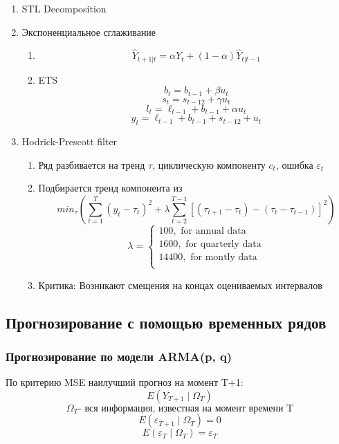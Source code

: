 \documentclass[a4paper, 12pt]{article}
\begin{document}
\begin{enumerate}
    \item STL Decomposition
    \item Экспоненциальное сглаживание
    \begin{enumerate}
        \item \[\hat Y_{t+1 | t} = \alpha Y_t + (1 - \alpha) \hat Y_{t|t - 1}\]
        \item ETS
        \[b_{t} = b_{t-1} + \beta u_t\]
        \[s_t = s_{t - 12} + \gamma u_t\]
        \[l_t = \ell_{t - 1} + b_{t - 1} + \alpha u_{t}\]
        \[y_t = \ell_{t - 1} + b_{t - 1} + s_{t - 12} + u_t\]
    \end{enumerate}
    \item Hodrick-Prescott filter
    \begin{enumerate}
        \item Ряд разбивается на тренд $\tau$, циклическую компоненту $c_t$, ошибка $\varepsilon_t$
        \item Подбирается тренд компонента из
        \[min_\tau(\sum_{t = 1}^T(y_t - \tau_t)^2 + \lambda \sum_{t = 2}^{T - 1}[(\tau_{t+1} - \tau_{t}) - (\tau_t - \tau_{t - 1})]^2)\]
        \[\lambda = \begin{cases}
            100, \textrm{ for annual data} \\
            1600, \textrm{ for quarterly data} \\
            14400, \textrm{ for montly data} \\
        \end{cases}\]
        \item Критика: Возникают смещения на концах оцениваемых интервалов
    \end{enumerate}
\end{enumerate}

\subsection{Прогнозирование с помощью временных рядов}

\subsubsection{Прогнозирование по модели ARMA(p, q)}

По критерию MSE наилучший прогноз на момент T+1:
\[E(Y_{T+1} \mid \Omega_{T})\]
\[\Omega_{T} \textrm{- вся информация, известная на момент времени T}\]
\[E(\varepsilon_{T+1} \mid \Omega_{T}) = 0\]
\[E(\varepsilon_{T} \mid \Omega_{T}) = \varepsilon_T\]
\end{document}
